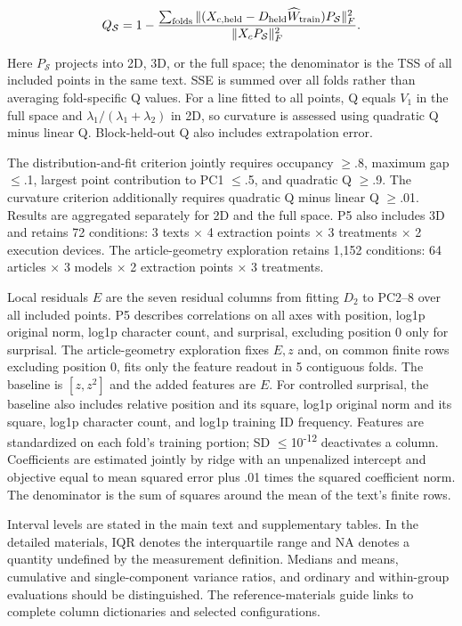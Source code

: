 \[
Q_{\mathcal S}=1-
\frac{\sum_{\rm folds}\|(X_{c,\rm held}-D_{\rm held}\widehat W_{\rm train})P_{\mathcal S}\|_F^2}
{\|X_cP_{\mathcal S}\|_F^2}.
\]

Here \(P_{\mathcal S}\) projects into 2D, 3D, or the full space; the denominator is the TSS of all included points in the same text. SSE is summed over all folds rather than averaging fold-specific Q values. For a line fitted to all points, Q equals \(V_1\) in the full space and \(\lambda_1/(\lambda_1+\lambda_2)\) in 2D, so curvature is assessed using quadratic Q minus linear Q. Block-held-out Q also includes extrapolation error.

The distribution-and-fit criterion jointly requires occupancy {\(\geq\).8,} maximum gap {\(\leq\).1,} largest point contribution to PC1 {\(\leq\).5,} and quadratic Q {\(\geq\).9.} The curvature criterion additionally requires quadratic Q minus linear Q {\(\geq\).01.} Results are aggregated separately for 2D and the full space. P5 also includes 3D and retains 72 conditions: 3 texts × 4 extraction points × 3 treatments × 2 execution devices. The article-geometry exploration retains 1,152 conditions: 64 articles × 3 models × 2 extraction points × 3 treatments.

Local residuals \(E\) are the seven residual columns from fitting \(D_2\) to PC2--8 over all included points. P5 describes correlations on all axes with position, log1p original norm, log1p character count, and surprisal, excluding position 0 only for surprisal. The article-geometry exploration fixes \(E,z\) and, on common finite rows excluding position 0, fits only the feature readout in 5 contiguous folds. The baseline is \([z,z^2]\) and the added features are \(E\). For controlled surprisal, the baseline also includes relative position and its square, log1p original norm and its square, log1p character count, and log1p training ID frequency. Features are standardized on each fold's training portion; SD {\(\leq\)10\textsuperscript{-}\textsuperscript{1}\textsuperscript{2}} deactivates a column. Coefficients are estimated jointly by ridge with an unpenalized intercept and objective equal to mean squared error plus .01 times the squared coefficient norm. The denominator is the sum of squares around the mean of the text's finite rows.

Interval levels are stated in the main text and supplementary tables. In the detailed materials, IQR denotes the interquartile range and NA denotes a quantity undefined by the measurement definition. Medians and means, cumulative and single-component variance ratios, and ordinary and within-group evaluations should be distinguished. The reference-materials guide links to complete column dictionaries and selected configurations.



